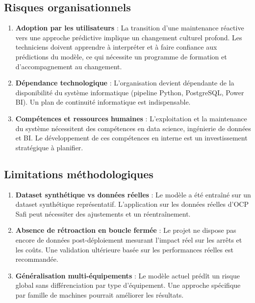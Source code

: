 \documentclass[a4paper,12pt]{report}
\begin{document}
\subsection{Risques organisationnels}

\begin{enumerate}
    \item \textbf{Adoption par les utilisateurs} : La transition d'une maintenance réactive vers une approche prédictive implique un changement culturel profond. Les techniciens doivent apprendre à interpréter et à faire confiance aux prédictions du modèle, ce qui nécessite un programme de formation et d'accompagnement au changement.
    
    \item \textbf{Dépendance technologique} : L'organisation devient dépendante de la disponibilité du système informatique (pipeline Python, PostgreSQL, Power BI). Un plan de continuité informatique est indispensable.
    
    \item \textbf{Compétences et ressources humaines} : L'exploitation et la maintenance du système nécessitent des compétences en data science, ingénierie de données et BI. Le développement de ces compétences en interne est un investissement stratégique à planifier.
\end{enumerate}

\subsection{Limitations méthodologiques}

\begin{enumerate}
    \item \textbf{Dataset synthétique vs données réelles} : Le modèle a été entraîné sur un dataset synthétique représentatif. L'application sur les données réelles d'OCP Safi peut nécessiter des ajustements et un réentraînement.
    
    \item \textbf{Absence de rétroaction en boucle fermée} : Le projet ne dispose pas encore de données post-déploiement mesurant l'impact réel sur les arrêts et les coûts. Une validation ultérieure basée sur les performances réelles est recommandée.
    
    \item \textbf{Généralisation multi-équipements} : Le modèle actuel prédît un risque global sans différenciation par type d'équipement. Une approche spécifique par famille de machines pourrait améliorer les résultats.
\end{enumerate}
\end{document}
